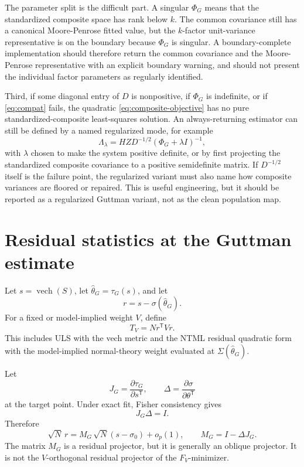 \documentclass[11pt]{article}
\newcommand{\T}{^{\mathsf T}}
\newcommand{\vech}{\operatorname{vech}}
\theoremstyle{plain}
\theoremstyle{remark}
\begin{document}
The parameter split is the difficult part. A singular \(\Phi_G\) means that the
standardized composite space has rank below \(k\). The common covariance still
has a canonical Moore-Penrose fitted value, but the \(k\)-factor unit-variance
representative is on the boundary because \(\Phi_G\) is singular. A
boundary-complete implementation should therefore return the common covariance
and the Moore-Penrose representative with an explicit boundary warning, and
should not present the individual factor parameters as regularly identified.

Third, if some diagonal entry of \(D\) is nonpositive, if \(\Phi_G\) is
indefinite, or if \eqref{eq:compat} fails, the quadratic
\eqref{eq:composite-objective} has no pure standardized-composite
least-squares solution. An always-returning estimator can still be defined by a
named regularized mode, for example
\[
  \Lambda_{\lambda}=HZD^{-1/2}(\Phi_G+\lambda I)^{-1},
\]
with \(\lambda\) chosen to make the system positive definite, or by first
projecting the standardized composite covariance to a positive semidefinite
matrix. If \(D^{-1/2}\) itself is the failure point, the regularized variant
must also name how composite variances are floored or repaired. This is useful
engineering, but it should be reported as a regularized Guttman variant, not as
the clean population map.

\section{Residual statistics at the Guttman estimate}

Let \(s=\vech(S)\), let \(\hat\theta_G=\tau_G(s)\), and let
\[
  r=s-\sigma(\hat\theta_G).
\]
For a fixed or model-implied weight \(V\), define
\begin{equation}\label{eq:TV}
  T_V=N r\T V r .
\end{equation}
This includes ULS with the vech metric and the NTML residual quadratic form with
the model-implied normal-theory weight evaluated at
\(\Sigma(\hat\theta_G)\).

Let
\[
  J_G=\frac{\partial\tau_G}{\partial s\T},
  \qquad
  \Delta=\frac{\partial\sigma}{\partial\theta\T}
\]
at the target point. Under exact fit, Fisher consistency gives
\[
  J_G\Delta=I .
\]
Therefore
\begin{equation}\label{eq:resid-projector}
  \sqrt N\,r
  =
  M_G\,\sqrt N(s-\sigma_0)+o_p(1),
  \qquad
  M_G=I-\Delta J_G .
\end{equation}
The matrix \(M_G\) is a residual projector, but it is generally an oblique
projector. It is not the \(V\)-orthogonal residual projector of the
\(F_V\)-minimizer.
\end{document}
